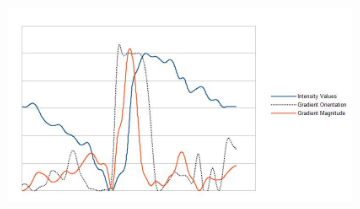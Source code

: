 \begin{figure}[htbp]
\begin{subfigure}[b]{0.15\textwidth}
		\caption{}
		\label{fig:kalahari_patch_arrow}
	\end{subfigure}
	\begin{subfigure}[b]{0.65\textwidth}
		\centering
		\includegraphics[width=\textwidth]{figures/kalahari_patch_plot}
		\caption{}
		\label{fig:kalahari_patch_plot}
	\end{subfigure}
	

\end{figure}
